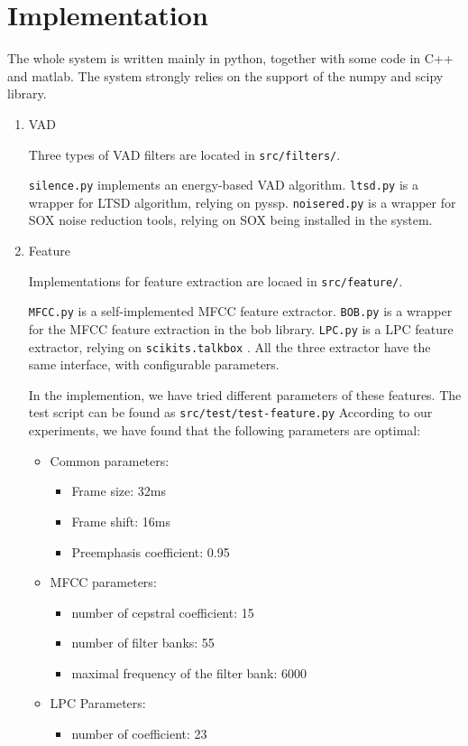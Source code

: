 

\section{Implementation}
The whole system is written mainly in python, together with some code in C++ and matlab.
The system strongly relies on the support of the numpy\cite{numpy} and scipy\cite{scipy} library.

\begin{enumerate}
    \item VAD

      Three types of  VAD filters are located in \verb|src/filters/|.

      \verb|silence.py| implements an energy-based VAD algorithm.
      \verb|ltsd.py| is a wrapper for LTSD algorithm, relying on pyssp\cite{pyssp}.
      \verb|noisered.py| is a wrapper for SOX noise reduction tools, relying on SOX \cite{sox} being
      installed in the system.

    \item Feature

      Implementations for feature extraction are locaed in \verb|src/feature/|.

      \verb|MFCC.py| is a self-implemented MFCC feature extractor.
      \verb|BOB.py| is a wrapper for the MFCC feature extraction in the bob \cite{bob2012} library.
      \verb|LPC.py| is a LPC feature extractor, relying on \verb|scikits.talkbox| \cite{talkbox}.
      All the three extractor have the same interface, with configurable parameters.

      In the implemention, we have  tried different parameters of these features.
      The test script can be found as \verb|src/test/test-feature.py|
      According to our experiments, we have found that the following parameters are optimal:
      \begin{itemize}
        \item Common parameters:
          \begin{itemize}
            \item Frame size: 32ms
            \item Frame shift: 16ms
            \item Preemphasis coefficient: 0.95
          \end{itemize}
        \item MFCC parameters:
          \begin{itemize}
            \item number of cepstral coefficient: 15
            \item number of filter banks: 55
            \item maximal frequency of the filter bank: 6000
          \end{itemize}
        \item LPC Parameters:
          \begin{itemize}
            \item number of coefficient: 23
          \end{itemize}
      \end{itemize}


\end{enumerate}
